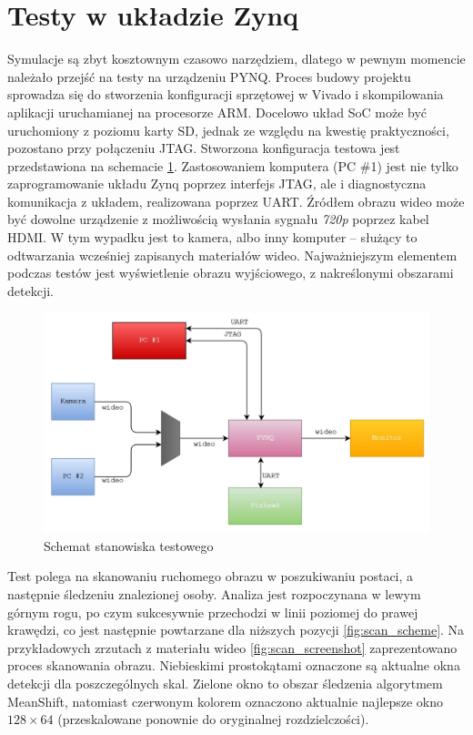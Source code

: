 \section{Testy w układzie Zynq}

Symulacje są zbyt kosztownym czasowo narzędziem, dlatego w pewnym momencie należało przejść na testy na urządzeniu PYNQ. 
Proces budowy projektu sprowadza się do stworzenia konfiguracji sprzętowej w Vivado i skompilowania aplikacji uruchamianej na procesorze ARM. 
Docelowo układ SoC może być uruchomiony z poziomu karty SD, jednak ze względu na kwestię praktyczności, pozostano przy połączeniu JTAG. 
Stworzona konfiguracja testowa jest przedstawiona na schemacie \ref{fig:testing_setup}.
Zastosowaniem komputera (PC \#1) jest nie tylko zaprogramowanie układu Zynq poprzez interfejs JTAG, ale i diagnostyczna komunikacja z układem, realizowana poprzez UART. 
Źródłem obrazu wideo może być dowolne urządzenie z możliwością wysłania sygnału \textit{720p} poprzez kabel HDMI. 
W tym wypadku jest to kamera, albo inny komputer -- służący to odtwarzania wcześniej zapisanych materiałów wideo. 
Najważniejszym elementem podczas testów jest wyświetlenie obrazu wyjściowego, z nakreślonymi obszarami detekcji.
\begin{figure}[h]
	\centering
	\includegraphics[width=14cm]{6_testing_setup.jpg}
	\caption{Schemat stanowiska testowego}
	\label{fig:testing_setup}
\end{figure}

Test polega na skanowaniu ruchomego obrazu w poszukiwaniu postaci, a następnie śledzeniu znalezionej osoby. 
Analiza jest rozpoczynana w lewym górnym rogu, po czym sukcesywnie przechodzi w linii poziomej do prawej krawędzi, co jest następnie powtarzane dla niższych pozycji \ref{fig:scan_scheme}.
Na przykładowych zrzutach z materiału wideo \ref{fig:scan_screenshot} zaprezentowano proces skanowania obrazu. 
Niebieskimi prostokątami oznaczone są aktualne okna detekcji dla poszczególnych skal. 
Zielone okno to obszar śledzenia algorytmem MeanShift, natomiast czerwonym kolorem oznaczono aktualnie najlepsze okno $128 \times 64$ (przeskalowane ponownie do oryginalnej rozdzielczości).

